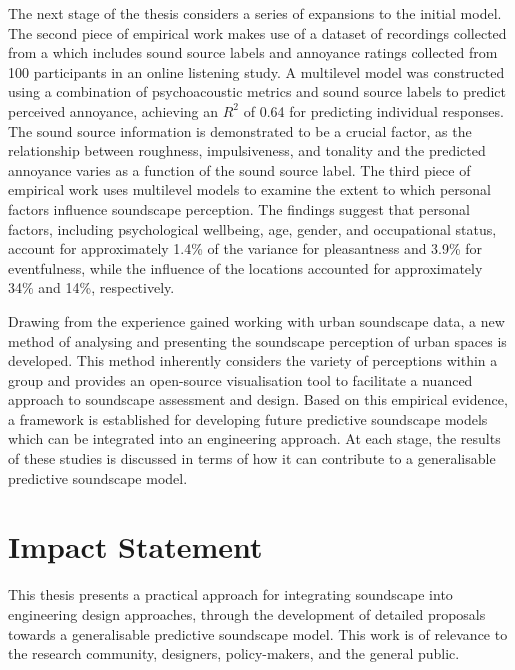 \documentclass[twoside,fontsize=11pt,titlepage,chapterprefix=true
]{scrbook}
\begin{document}
The next stage of the thesis considers a series of expansions to the initial model. The second piece of empirical work makes use of a dataset of recordings collected from a  which includes sound source labels and annoyance ratings collected from 100 participants in an online listening study. A multilevel model was constructed using a combination of psychoacoustic metrics and sound source labels to predict perceived annoyance, achieving an $R^2$ of 0.64 for predicting individual responses. The sound source information is demonstrated to be a crucial factor, as the relationship between roughness, impulsiveness, and tonality and the predicted annoyance varies as a function of the sound source label. The third piece of empirical work uses multilevel models to examine the extent to which personal factors influence soundscape perception. The findings suggest that personal factors, including psychological wellbeing, age, gender, and occupational status, account for approximately 1.4\% of the variance for pleasantness and 3.9\% for eventfulness, while the influence of the locations accounted for approximately 34\% and 14\%, respectively. 

Drawing from the experience gained working with urban soundscape data, a new method of analysing and presenting the soundscape perception of urban spaces is developed. This method inherently considers the variety of perceptions within a group and provides an open-source visualisation tool to facilitate a nuanced approach to soundscape assessment and design. Based on this empirical evidence, a framework is established for developing future predictive soundscape models which can be integrated into an engineering approach. At each stage, the results of these studies is discussed in terms of how it can contribute to a generalisable predictive soundscape model. 


\chapter*{Impact Statement}
This thesis presents a practical approach for integrating soundscape into engineering design approaches, through the development of detailed proposals towards a generalisable predictive soundscape model. This work is of relevance to the research community, designers, policy-makers, and the general public. 
\end{document}
